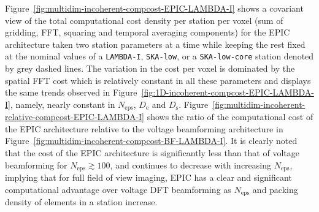 \documentclass[
  journal=pasa,
  manuscript=article-type,
  year=2020,
  volume=37,
]{cup-journal}
\begin{document}
Figure~\ref{fig:multidim-incoherent-compcost-EPIC-LAMBDA-I} shows a covariant view of the total computational cost density per station per voxel (sum of gridding, FFT, squaring and temporal averaging components) for the EPIC architecture taken two station parameters at a time while keeping the rest fixed at the nominal values of a \texttt{LAMBDA-I}, \texttt{SKA-low}, or a \texttt{SKA-low-core} station denoted by grey dashed lines. The variation in the cost per voxel is dominated by the spatial FFT cost which is relatively constant in all these parameters and displays the same trends observed in Figure~\ref{fig:1D-incoherent-compcost-EPIC-LAMBDA-I}, namely, nearly constant in $N_\textrm{eps}$, $D_\textrm{e}$ and $D_\textrm{s}$. Figure~\ref{fig:multidim-incoherent-relative-compcost-EPIC-LAMBDA-I} shows the ratio of the computational cost of the EPIC architecture relative to the voltage beamforming architecture in Figure~\ref{fig:multidim-incoherent-compcost-BF-LAMBDA-I}. It is clearly noted that the cost of the EPIC architecture is significantly less than that of voltage beamforming for $N_\textrm{eps} \gtrsim 100$, and continues to decrease with increasing $N_\textrm{eps}$, implying that for full field of view imaging, EPIC has a clear and significant computational advantage over voltage DFT beamforming as $N_\textrm{eps}$ and packing density of elements in a station increase.
\end{document}
